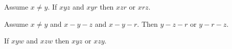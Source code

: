\documentclass{article}
\newcommand{\Betw}[3]{#1 #2 #3}
\newcommand{\Col}[3]{\operatorname{Col}(#1, #2, #3)}
\newcommand{\OFS}[8]{\operatorname{OFS}
\left(\begin{smallmatrix}%
#1 & #2 & #3 & #4 \\
#5 & #6 & #7 & #8
\end{smallmatrix}\right)%
}
\begin{document}
  \begin{forthel}

    \begin{axiom} %
      Assume $x \neq y$.
      If $\Betw{x}{y}{z}$ and $\Betw{x}{y}{r}$
      then $\Betw{x}{z}{r}$ or $\Betw{x}{r}{z}$.
    \end{axiom}

    \begin{lemma}[D5o2]
      Assume $x \neq y$ and $x-y-z$ and $x-y-r$. Then $y-z-r$ or $y-r-z$.
    \end{lemma}

    \begin{theorem}[D5o3]
      If $\Betw{x}{y}{w}$ and $\Betw{x}{z}{w}$ then $\Betw{x}{y}{z}$ or $\Betw{x}{z}{y}$.
    \end{theorem}
  \end{forthel}
\end{document}
